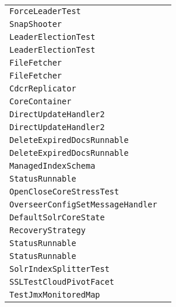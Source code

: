\begin{center}
\begin{tabular}{ll}
\lstinline/ForceLeaderTest/&\raisebox{0pt}{\lstinline/bringBackOldLeaderAndSendDoc(String)/}\\
\lstinline/SnapShooter/&\raisebox{0pt}{\lstinline/deleteNamedSnapshot(ReplicationHandle)/}\\
\lstinline/LeaderElectionTest/&\raisebox{0pt}{\lstinline/ParallelElection()/}\\
\lstinline/LeaderElectionTest/&\raisebox{0pt}{\lstinline/ParallelElection()/}\\
\lstinline/FileFetcher/&\raisebox{0pt}{\lstinline/cleanup()/}\\
\lstinline/FileFetcher/&\raisebox{0pt}{\lstinline/cleanup()/}\\
\lstinline/CdcrReplicator/&\raisebox{0pt}{\lstinline/handleException(Exceptione)/}\\
\lstinline/CoreContainer/&\raisebox{0pt}{\lstinline/swap(Stringn0,Stringn1)/}\\
\lstinline/DirectUpdateHandler2/&\raisebox{0pt}{\lstinline/rollback(RollbackUpdatecommand))/}\\
\lstinline/DirectUpdateHandler2/&\raisebox{0pt}{\lstinline/rollback(RollbackUpdatecommand))/}\\
\lstinline/DeleteExpiredDocsRunnable/&\raisebox{0pt}{\lstinline/run()/}\\
\lstinline/DeleteExpiredDocsRunnable/&\raisebox{0pt}{\lstinline/run()/}\\
\lstinline/ManagedIndexSchema/&\raisebox{0pt}{\lstinline/newFieldType(String))/}\\
\lstinline/StatusRunnable/&\raisebox{0pt}{\lstinline/sendBootstrapCommand())/}\\
\lstinline/OpenCloseCoreStressTest/&\raisebox{0pt}{\lstinline/checkResults(HttpSolrClient))/}\\
\lstinline/OverseerConfigSetMessageHandler/&\raisebox{0pt}{\lstinline/createConfigSet(ZkNodeProps))/}\\
\lstinline/DefaultSolrCoreState/&\raisebox{0pt}{\lstinline/run()/}\\
\lstinline/RecoveryStrategy/&\raisebox{0pt}{\lstinline/replay(SolrCore)/}\\
\lstinline/StatusRunnable/&\raisebox{0pt}{\lstinline/sendBootstrapCommand())/}\\
\lstinline/StatusRunnable/&\raisebox{0pt}{\lstinline/sendBootstrapCommand())/}\\
\lstinline/SolrIndexSplitterTest/&\raisebox{0pt}{\lstinline/SplitAlternately()/}\\
\lstinline/SSLTestCloudPivotFacet/&\raisebox{0pt}{\lstinline/assertPivotCountsAreCorrect(SolrParams)()/}\\
\lstinline/TestJmxMonitoredMap/&\raisebox{0pt}{\lstinline/beforesetUp()/}\\

\bottomrule
\end{tabular}
\end{center}

